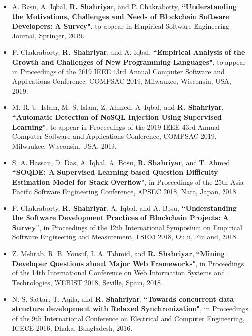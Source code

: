 \documentclass[letterpaper,11pt]{article}
\begin{document}
\begin{itemize}
\item A. Bosu, A. Iqbal, {\bf R. Shahriyar}, and P. Chakraborty, {\color{black} \bf
    ``Understanding the Motivations, Challenges and Needs of Blockchain Software Developers: A Survey"}, to appear in Empirical Software Engineering Journal, Springer, 2019.

\item P. Chakraborty, {\bf R. Shahriyar}, and A. Iqbal, {\color{black} \bf
    ``Empirical Analysis of the Growth and Challenges of New Programming Languages"}, to appear in Proceedings of the 2019 IEEE 43rd Annual Computer Software and Applications Conference, COMPSAC 2019, Milwaukee, Wisconsin, USA, 2019.
    
\item M. R. U. Islam, M. S. Islam, Z. Ahmed, A. Iqbal, and {\bf R. Shahriyar}, {\color{black} \bf
    ``Automatic Detection of NoSQL Injection Using Supervised Learning"}, to appear in Proceedings of the 2019 IEEE 43rd Annual Computer Software and Applications Conference, COMPSAC 2019, Milwaukee, Wisconsin, USA, 2019.
    
\item S. A. Hassan, D. Das, A. Iqbal, A. Bosu, {\bf R. Shahriyar}, and T. Ahmed, {\color{black} \bf
    ``SOQDE: A Supervised Learning based Question Difficulty Estimation Model for Stack Overflow"}, in Proceedings of the 25th Asia-Pacific Software Engineering Conference, APSEC 2018, Nara, Japan, 2018. 
    
\item P. Chakraborty, {\bf R. Shahriyar}, A. Iqbal, and A. Bosu, {\color{black} \bf
    ``Understanding the Software Development Practices of Blockchain Projects: A Survey"}, in Proceedings of the 12th International Symposium on Empirical Software Engineering and Measurement, ESEM 2018, Oulu, Finland, 2018.

\item Z. Mehrab, R. B. Yousuf, I. A. Tahmid, and {\bf R. Shahriyar}, {\color{black} \bf
    ``Mining Developer Questions about Major Web Frameworks"}, in Proceedings of the 14th International Conference on Web Information Systems and Technologies, WEBIST 2018, Seville, Spain, 2018.

\item N. S. Sattar, T. Aqila, and {\bf R. Shahriyar}, {\color{black} \bf
    ``Towards concurrent data structure development with Relaxed Synchronization"}, in Proceedings of the 9th International Conference on Electrical and Computer Engineering, ICECE 2016, Dhaka, Bangladesh, 2016.


\end{itemize}
\end{document}
